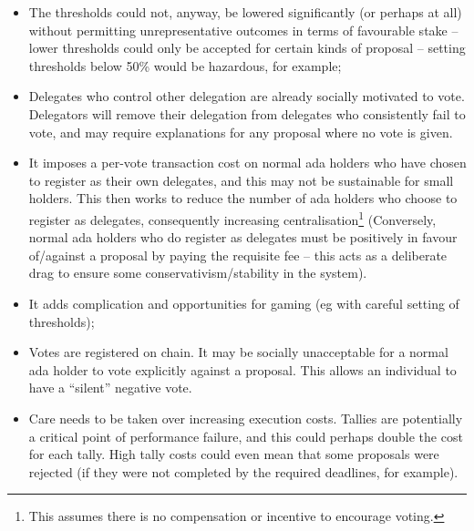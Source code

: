 \begin{itemize}
\item
  The thresholds could not, anyway, be lowered significantly (or perhaps at all) without permitting unrepresentative outcomes in terms of
  favourable stake -- lower thresholds could only be accepted for certain kinds of proposal -- setting thresholds below 50\% would be hazardous, for example;
\item
  Delegates who control other delegation are already socially motivated to vote.  Delegators will remove their delegation from delegates who consistently fail to vote,
  and may require explanations for any proposal where no vote is given.
\item
  It imposes a per-vote transaction cost on normal ada holders who have chosen to register as their own delegates, and this may not be sustainable for small holders.
  This then works to reduce the number of ada holders who choose to register as delegates, consequently increasing centralisation\footnote{This assumes there is no compensation or incentive to encourage voting.}
  (Conversely, normal ada holders who do register as delegates must be positively in favour of/against a proposal by paying the requisite fee -- this acts as a deliberate drag
  to ensure some conservativism/stability in the system).
\item
  It adds complication and opportunities for gaming (eg with careful setting of thresholds);
\item
  Votes are registered on chain.  It may be socially unacceptable for a normal ada holder to vote explicitly against a proposal.  This allows an individual to have a ``silent'' negative vote.
\item
  Care needs to be taken over increasing execution costs. Tallies are potentially a critical point of performance failure, and this could perhaps double
  the cost for each tally.  High tally costs could even mean that some proposals were rejected (if they were not completed by the required deadlines, for example).
\end{itemize}
